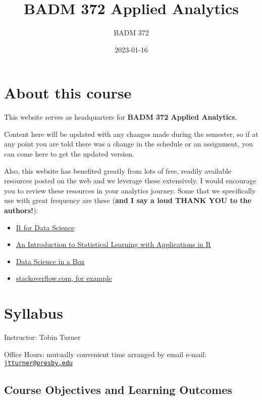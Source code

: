 \documentclass[
]{book}
\title{BADM 372 Applied Analytics}
\author{BADM 372}
\date{2023-01-16}
\providecommand{\tightlist}{%
  \setlength{\itemsep}{0pt}\setlength{\parskip}{0pt}}
\begin{document}
\maketitle

{
\setcounter{tocdepth}{1}
\tableofcontents
}
\hypertarget{about-this-course}{%
\chapter{About this course}\label{about-this-course}}

This website serves as headquarters for \textbf{BADM 372 Applied Analytics}.

Content here will be updated with any changes made during the semester, so if at any point you are told there was a change in the schedule or an assignment, you can come here to get the updated version.

Also, this website has benefited greatly from lots of free, readily available resources posted on the web and we leverage these extensively. I would encourage you to review these resources in your analytics journey. Some that we specifically use with great frequency are these (\textbf{and I say a loud THANK YOU to the authors!}):

\begin{itemize}
\tightlist
\item
  \href{https://r4ds.had.co.nz/}{R for Data Science}
\item
  \href{https://trevorhastie.github.io/ISLR/}{An Introduction to Statistical Learning with Applications in R}
\item
  \href{https://datasciencebox.org/}{Data Science in a Box}
\item
  \href{https://stackoverflow.com/questions/4862178/remove-rows-with-all-or-some-nas-missing-values-in-data-frame?rq=1}{stackoverflow.com, for example}
\end{itemize}

\hypertarget{syllabus}{%
\chapter{Syllabus}\label{syllabus}}

Instructor: Tobin Turner

Office Hours: mutually convenient time arranged by email e-mail: \href{mailto:jtturner@presby.edu}{\nolinkurl{jtturner@presby.edu}}

\hypertarget{course-objectives-and-learning-outcomes}{%
\section{Course Objectives and Learning Outcomes}\label{course-objectives-and-learning-outcomes}}
\end{document}
